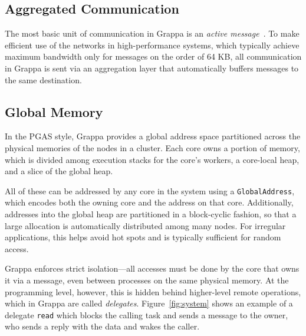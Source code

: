 \subsection{Aggregated Communication}
The most basic unit of communication in Grappa is an \emph{active message}~\cite{vonEicken92}.
To make efficient use of the networks in high-performance systems, which typically achieve maximum bandwidth only for messages on the order of 64 KB, all communication in Grappa is sent via an aggregation layer that automatically buffers messages to the same destination.

\subsection{Global Memory}
In the PGAS style, Grappa provides a global address space partitioned across the physical memories of the nodes in a cluster. Each core owns a portion of memory, which is divided among execution stacks for the core's workers, a core-local heap, and a slice of the global heap.

All of these can be addressed by any core in the system using a \texttt{GlobalAddress}, which encodes both the owning core and the address on that core. Additionally, addresses into the global heap are partitioned in a block-cyclic fashion, so that a large allocation is automatically distributed among many nodes. For irregular applications, this helps avoid hot spots and is typically sufficient for random access.

Grappa enforces strict isolation---all accesses must be done by the core that owns it via a message, even between processes on the same physical memory. At the programming level, however, this is hidden behind higher-level remote operations, which in Grappa are called \emph{delegates}. Figure~\ref{fig:system} shows an example of a delegate \texttt{read} which blocks the calling task and sends a message to the owner, who sends a reply with the data and wakes the caller.

